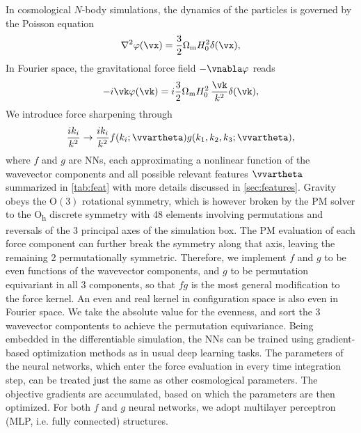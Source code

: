\documentclass[modern, trackchanges, dvipsnames]{aastex631}
\newcommand{\Omegam}{\Omega_\mathrm{m}}
\begin{document}
In cosmological $N$-body simulations, the dynamics of the particles is governed
by the Poisson equation
%
\begin{equation}
  \nabla^2 \varphi(\vx) = \frac32 \Omegam H_0^2 \delta(\vx),
\end{equation}
%
In Fourier space, the gravitational force field $- \vnabla \varphi$ reads
%
\begin{equation}
- i \vk \varphi(\vk) = i \frac32 \Omegam H_0^2 \,\frac{\vk}{k^2} \delta(\vk),
\end{equation}
%
We introduce force sharpening through
%
\begin{equation}
\frac{i k_i}{k^2} \to \frac{i k_i}{k^2}
  f(k_i; \vvartheta) g(k_1, k_2, k_3; \vvartheta),
\end{equation}
%
where $f$ and $g$ are NNs, each approximating a nonlinear function of the
wavevector components and all possible relevant features $\vvartheta$ summarized
in \autoref{tab:feat} with more details discussed in \autoref{sec:features}.
Gravity obeys the $\mathrm{O}(3)$ rotational symmetry, which is however
broken by the PM solver to the O\textsubscript{h} discrete symmetry with
48 elements involving permutations and reversals of the 3 principal axes
of the simulation box.
The PM evaluation of each force component can further break the symmetry
along that axis, leaving the remaining 2 permutationally symmetric.
Therefore, we implement $f$ and $g$ to be even functions of the
wavevector components, and $g$ to be permutation equivariant in all 3
components, so that $f g$ is the most general modification to the force
kernel.
An even and real kernel in configuration space is also even in Fourier
space.
We take the absolute value for the evenness, and sort the 3 wavevector
compontents to achieve the permutation equivariance.
Being embedded in the differentiable simulation, the NNs can be trained using
gradient-based optimization methods as in usual deep learning tasks.
The parameters of the neural networks, which enter the force evaluation in
every time integration step, can be treated just the same as other cosmological
parameters.
The objective gradients are accumulated, based on which the parameters are then
optimized.
For both $f$ and $g$ neural networks, we adopt multilayer perceptron (MLP, i.e.
fully connected) structures.
\end{document}
